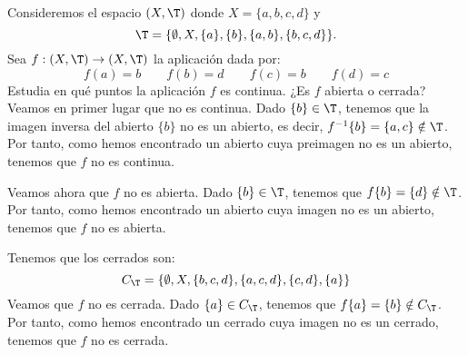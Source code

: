\begin{ejercicio}
    Consideremos el espacio $(X, \T )$ donde $X = \{a, b, c, d\}$ y
    \begin{equation*}
        \T = \{\emptyset, X, \{a\}, \{b\}, \{a, b\}, \{b, c, d\}\}.
    \end{equation*}
    Sea $f : (X, \T ) \to (X, \T )$ la aplicación dada por: $$f(a) = b\qquad f(b) = d\qquad f(c) = b\qquad f(d) = c$$
    Estudia en qué puntos la aplicación $f$ es continua. ¿Es $f$ abierta o cerrada?\\

    Veamos en primer lugar que no es continua. Dado $\{b\}\in \T$, tenemos que la imagen inversa del abierto $\{b\}$ no es un abierto, es decir, $f^{-1}\{b\}=\{a,c\}\notin \T$. Por tanto, como hemos encontrado un abierto cuya preimagen no es un abierto, tenemos que $f$ no es continua.

    Veamos ahora que $f$ no es abierta. Dado $\{b\}\in \T$, tenemos que $f\{b\}=\{d\}\notin \T$. Por tanto, como hemos encontrado un abierto cuya imagen no es un abierto, tenemos que $f$ no es abierta.

    Tenemos que los cerrados son:
    \begin{equation*}
        C_\T=\{\emptyset, X, \{b,c,d\}, \{a,c,d\}, \{c,d\}, \{a\}\}
    \end{equation*}
    Veamos que $f$ no es cerrada. Dado $\{a\}\in C_\T$, tenemos que $f\{a\}=\{b\}\notin C_\T$. Por tanto, como hemos encontrado un cerrado cuya imagen no es un cerrado, tenemos que $f$ no es cerrada.
\end{ejercicio}


